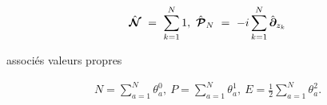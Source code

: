 \begin{eqnarray}
	\hat{\bm{ \mathcal{N}}} ~ = ~ \sum_{k = 1}^N 1,~\hat{\bm{ \mathcal{P}}}_N  ~=~- i\sum_{k = 1}^N \hat{\bm{\partial}}_{z_k}	
\end{eqnarray}

associés valeurs propres 

\begin{eqnarray}
	N = \sum_{a = 1}^N \theta_a^0 , ~ P = \sum_{a = 1}^N \theta_a^1 ,~E = \frac{1}{2}\sum_{a = 1}^N \theta_a^2.	
\end{eqnarray}
